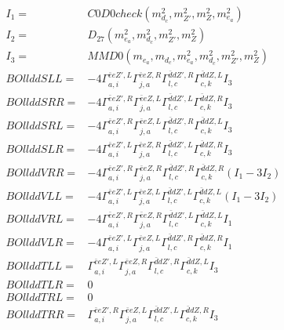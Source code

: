 \documentclass[A4,landscape]{article}
\begin{document}
\begin{align} 
I_1 = & C0D0check(m^2_{d_{{c}}}, m^2_{{Z'}}, m^2_{Z}, m^2_{e_{{a}}}) \\ 
I_2 = & D_{27}(m^2_{e_{{a}}}, m^2_{d_{{c}}}, m^2_{{Z'}}, m^2_{Z}) \\ 
I_3 = & MMD0(m_{e_{{a}}}, m_{d_{{c}}}, m^2_{e_{{a}}}, m^2_{d_{{c}}}, m^2_{{Z'}}, m^2_{Z}) \\ 
  BOllddSLL= & -4  \Gamma^{\bar{e}e {Z'} ,L}_{a, i} \Gamma^{\bar{e}e Z ,R}_{j, a} \Gamma^{\bar{d}d {Z'} ,R}_{l, c} \Gamma^{\bar{d}d Z ,L}_{c, k} I_3 \\ 
  BOllddSRR= & -4  \Gamma^{\bar{e}e {Z'} ,R}_{a, i} \Gamma^{\bar{e}e Z ,L}_{j, a} \Gamma^{\bar{d}d {Z'} ,L}_{l, c} \Gamma^{\bar{d}d Z ,R}_{c, k} I_3 \\ 
  BOllddSRL= & -4  \Gamma^{\bar{e}e {Z'} ,R}_{a, i} \Gamma^{\bar{e}e Z ,L}_{j, a} \Gamma^{\bar{d}d {Z'} ,R}_{l, c} \Gamma^{\bar{d}d Z ,L}_{c, k} I_3 \\ 
  BOllddSLR= & -4  \Gamma^{\bar{e}e {Z'} ,L}_{a, i} \Gamma^{\bar{e}e Z ,R}_{j, a} \Gamma^{\bar{d}d {Z'} ,L}_{l, c} \Gamma^{\bar{d}d Z ,R}_{c, k} I_3 \\ 
  BOllddVRR= & -4  \Gamma^{\bar{e}e {Z'} ,R}_{a, i} \Gamma^{\bar{e}e Z ,R}_{j, a} \Gamma^{\bar{d}d {Z'} ,R}_{l, c} \Gamma^{\bar{d}d Z ,R}_{c, k} (I_1 - 3 I_2) \\ 
  BOllddVLL= & -4  \Gamma^{\bar{e}e {Z'} ,L}_{a, i} \Gamma^{\bar{e}e Z ,L}_{j, a} \Gamma^{\bar{d}d {Z'} ,L}_{l, c} \Gamma^{\bar{d}d Z ,L}_{c, k} (I_1 - 3 I_2) \\ 
  BOllddVRL= & -4  \Gamma^{\bar{e}e {Z'} ,R}_{a, i} \Gamma^{\bar{e}e Z ,R}_{j, a} \Gamma^{\bar{d}d {Z'} ,L}_{l, c} \Gamma^{\bar{d}d Z ,L}_{c, k} I_1 \\ 
  BOllddVLR= & -4  \Gamma^{\bar{e}e {Z'} ,L}_{a, i} \Gamma^{\bar{e}e Z ,L}_{j, a} \Gamma^{\bar{d}d {Z'} ,R}_{l, c} \Gamma^{\bar{d}d Z ,R}_{c, k} I_1 \\ 
  BOllddTLL= &  \Gamma^{\bar{e}e {Z'} ,L}_{a, i} \Gamma^{\bar{e}e Z ,R}_{j, a} \Gamma^{\bar{d}d {Z'} ,R}_{l, c} \Gamma^{\bar{d}d Z ,L}_{c, k} I_3 \\ 
  BOllddTLR= & 0 \\ 
  BOllddTRL= & 0 \\ 
  BOllddTRR= &  \Gamma^{\bar{e}e {Z'} ,R}_{a, i} \Gamma^{\bar{e}e Z ,L}_{j, a} \Gamma^{\bar{d}d {Z'} ,L}_{l, c} \Gamma^{\bar{d}d Z ,R}_{c, k} I_3 \\ 
\end{align} 
\end{document}
